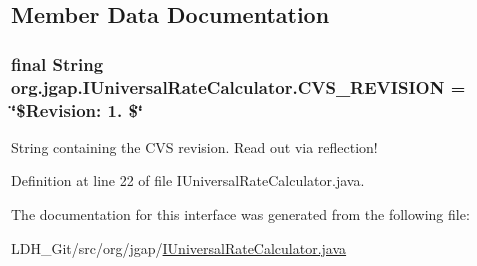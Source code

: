 \subsection{Member Data Documentation}
\hypertarget{interfaceorg_1_1jgap_1_1_i_universal_rate_calculator_a9bf3b2c269df5012cb0ed0079439346c}{
\subsubsection[{C\-V\-S\-\_\-\-R\-E\-V\-I\-S\-I\-O\-N}]{\setlength{\rightskip}{0pt plus 5cm}final String org.\-jgap.\-I\-Universal\-Rate\-Calculator.\-C\-V\-S\-\_\-\-R\-E\-V\-I\-S\-I\-O\-N = \char`\"{}\$Revision\-: 1. \$\char`\"{}\hspace{0.3cm}{\ttfamily [static]}}}\label{interfaceorg_1_1jgap_1_1_i_universal_rate_calculator_a9bf3b2c269df5012cb0ed0079439346c}
String containing the C\-V\-S revision. Read out via reflection! 

Definition at line 22 of file I\-Universal\-Rate\-Calculator.\-java.



The documentation for this interface was generated from the following file\-:\begin{DoxyCompactItemize}
\item 
L\-D\-H\-\_\-\-Git/src/org/jgap/\hyperlink{_i_universal_rate_calculator_8java}{I\-Universal\-Rate\-Calculator.\-java}\end{DoxyCompactItemize}
